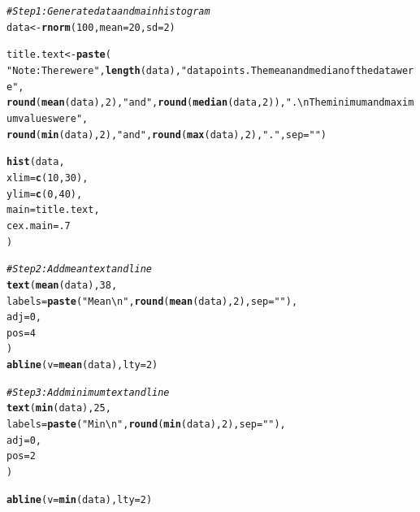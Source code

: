 \documentclass{tufte-book}\usepackage[]{graphicx}\usepackage[]{color}
\makeatletter
\newcommand{\hlnum}[1]{\textcolor[rgb]{0.686,0.059,0.569}{#1}}%
\newcommand{\hlstr}[1]{\textcolor[rgb]{0.192,0.494,0.8}{#1}}%
\newcommand{\hlcom}[1]{\textcolor[rgb]{0.678,0.584,0.686}{\textit{#1}}}%
\newcommand{\hlstd}[1]{\textcolor[rgb]{0.345,0.345,0.345}{#1}}%
\newcommand{\hlkwb}[1]{\textcolor[rgb]{0.69,0.353,0.396}{#1}}%
\newcommand{\hlkwc}[1]{\textcolor[rgb]{0.333,0.667,0.333}{#1}}%
\newcommand{\hlkwd}[1]{\textcolor[rgb]{0.737,0.353,0.396}{\textbf{#1}}}%
\newenvironment{kframe}{%
 \def\at@end@of@kframe{}%
 \ifinner\ifhmode%
  \def\at@end@of@kframe{\end{minipage}}%
  \begin{minipage}{\columnwidth}%
 \fi\fi%
 \def\FrameCommand##1{\hskip\@totalleftmargin \hskip-\fboxsep
 \colorbox{shadecolor}{##1}\hskip-\fboxsep
     \hskip-\linewidth \hskip-\@totalleftmargin \hskip\columnwidth}%
 \MakeFramed {\advance\hsize-\width
   \@totalleftmargin\z@ \linewidth\hsize
   \@setminipage}}%
 {\par\unskip\endMakeFramed%
 \at@end@of@kframe}
\newenvironment{knitrout}{}{} %
\makeatother
\begin{document}
\begin{footnotesize}
\begin{footnotesize}
\begin{knitrout}
\color{fgcolor}\begin{kframe}
\begin{alltt}
\hlcom{# Step 1: Generate data and main histogram}
\hlstd{data} \hlkwb{<-} \hlkwd{rnorm}\hlstd{(}\hlnum{100}\hlstd{,} \hlkwc{mean} \hlstd{=} \hlnum{20}\hlstd{,} \hlkwc{sd} \hlstd{=} \hlnum{2}\hlstd{)}

\hlstd{title.text} \hlkwb{<-} \hlkwd{paste}\hlstd{(}
  \hlstr{"Note: There were "}\hlstd{,} \hlkwd{length}\hlstd{(data),} \hlstr{" data points. The mean and median of the data were "}\hlstd{,}
  \hlkwd{round}\hlstd{(}\hlkwd{mean}\hlstd{(data),} \hlnum{2}\hlstd{),} \hlstr{" and "}\hlstd{,} \hlkwd{round}\hlstd{(}\hlkwd{median}\hlstd{(data,} \hlnum{2}\hlstd{)),} \hlstr{".\textbackslash{}nThe minimum and maximum values were "}\hlstd{,}
  \hlkwd{round}\hlstd{(}\hlkwd{min}\hlstd{(data),} \hlnum{2}\hlstd{),} \hlstr{" and "}\hlstd{,} \hlkwd{round}\hlstd{(}\hlkwd{max}\hlstd{(data),} \hlnum{2}\hlstd{),} \hlstr{"."}\hlstd{,} \hlkwc{sep} \hlstd{=} \hlstr{""}\hlstd{)}


\hlkwd{hist}\hlstd{(data,}
     \hlkwc{xlim} \hlstd{=} \hlkwd{c}\hlstd{(}\hlnum{10}\hlstd{,} \hlnum{30}\hlstd{),}
     \hlkwc{ylim} \hlstd{=} \hlkwd{c}\hlstd{(}\hlnum{0}\hlstd{,} \hlnum{40}\hlstd{),}
     \hlkwc{main} \hlstd{= title.text,}
     \hlkwc{cex.main} \hlstd{=} \hlnum{.7}
     \hlstd{)}

\hlcom{# Step 2: Add mean text and line}
\hlkwd{text}\hlstd{(}\hlkwd{mean}\hlstd{(data),} \hlnum{38}\hlstd{,}
     \hlkwc{labels} \hlstd{=} \hlkwd{paste}\hlstd{(}\hlstr{"Mean\textbackslash{}n"}\hlstd{,} \hlkwd{round}\hlstd{(}\hlkwd{mean}\hlstd{(data),} \hlnum{2}\hlstd{),} \hlkwc{sep} \hlstd{=} \hlstr{""}\hlstd{),}
     \hlkwc{adj} \hlstd{=} \hlnum{0}\hlstd{,}
     \hlkwc{pos} \hlstd{=} \hlnum{4}
\hlstd{)}
\hlkwd{abline}\hlstd{(}\hlkwc{v} \hlstd{=} \hlkwd{mean}\hlstd{(data),} \hlkwc{lty} \hlstd{=} \hlnum{2}\hlstd{)}

\hlcom{# Step 3: Add minimum text and line}
\hlkwd{text}\hlstd{(}\hlkwd{min}\hlstd{(data),} \hlnum{25}\hlstd{,}
     \hlkwc{labels} \hlstd{=} \hlkwd{paste}\hlstd{(}\hlstr{"Min\textbackslash{}n"}\hlstd{,} \hlkwd{round}\hlstd{(}\hlkwd{min}\hlstd{(data),} \hlnum{2}\hlstd{),} \hlkwc{sep} \hlstd{=} \hlstr{""}\hlstd{),}
     \hlkwc{adj} \hlstd{=} \hlnum{0}\hlstd{,}
     \hlkwc{pos} \hlstd{=} \hlnum{2}
\hlstd{)}

\hlkwd{abline}\hlstd{(}\hlkwc{v} \hlstd{=} \hlkwd{min}\hlstd{(data),} \hlkwc{lty} \hlstd{=} \hlnum{2}\hlstd{)}


\end{alltt}
\end{kframe}
\end{knitrout}
\end{footnotesize}
\end{footnotesize}
\end{document}
